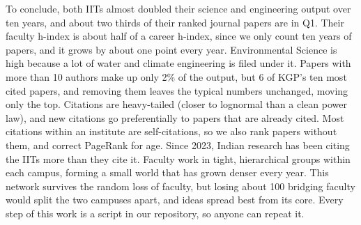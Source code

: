 \documentclass[conference,10pt]{IEEEtran}
\begin{document}
To conclude, both IITs almost doubled their science and engineering output over ten years, and about two thirds of
their ranked journal papers are in Q1. Their faculty h-index is about half of a career h-index, since we only count ten
years of papers, and it grows by about one point every year. Environmental Science is high because a lot of water and
climate engineering is filed under it. Papers with more than 10 authors make up only 2\% of the output, but 6 of KGP's
ten most cited papers, and removing them leaves the typical numbers unchanged, moving only the top. Citations are
heavy-tailed (closer to lognormal than a clean power law), and new citations go preferentially to papers that are
already cited. Most citations within an institute are self-citations, so we also rank papers without them, and correct
PageRank for age. Since 2023, Indian research has been citing the IITs more than they cite it. Faculty work in tight,
hierarchical groups within each campus, forming a small world that has grown denser every year. This network survives
the random loss of faculty, but losing about 100 bridging faculty would split the two campuses apart, and ideas spread
best from its core. Every step of this work is a script in our repository, so anyone can repeat it.
\end{document}
